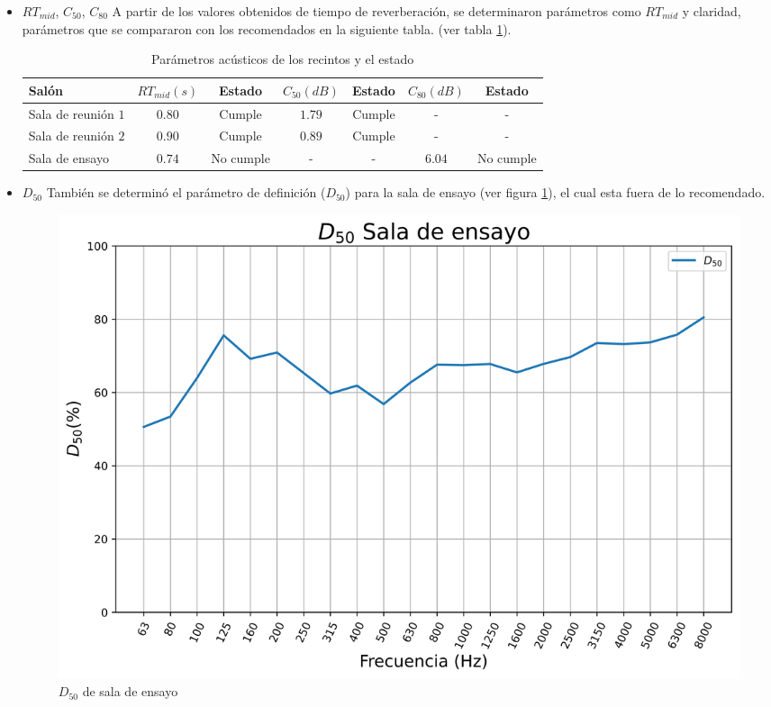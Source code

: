 \begin{itemize}
    \item $RT_{mid}$, $C_{50}$, $C_{80}$
    A partir de los valores obtenidos de tiempo de reverberación, se determinaron parámetros como $RT_{mid}$ y claridad, parámetros que se compararon con los recomendados en la siguiente tabla. (ver tabla \ref{tab: cumplimiento parametros RT}).
    \begin{table}[H]
        \centering
        \begin{tabular}{|l|c|c|c|c|c|c|}
        \hline
          \textbf{Salón}  & $RT_{mid} (s)$ & \textbf{Estado} & $C_{50}(dB)$ & \textbf{Estado} & $C_{80} (dB)$ & \textbf{Estado}\\ \hline
          Sala de reunión $1$   &  $0.80$ & Cumple & $1.79$ & Cumple  & - & - \\ \hline
          Sala de reunión $2$   & $0.90$ & Cumple & $0.89$ & Cumple & - & - \\ \hline
          Sala de ensayo        & $0.74$ & No cumple & - & - & $6.04$ & No cumple \\ \hline
        \end{tabular}
        \caption{Parámetros acústicos de los recintos y el estado}
        \label{tab: cumplimiento parametros RT}
    \end{table}
    \item $D_{50}$ 
    También se determinó el parámetro de definición ($D_{50}$) para la sala de ensayo (ver figura \ref{fig: D50 sala de ensayo}), el cual esta fuera de lo recomendado.
    \begin{figure}[H]
        \centering
        \includegraphics[scale=0.5]{Imagenes/Resultados/D50_ensayo.png}
        \caption{$D_{50}$ de sala de ensayo}
        \label{fig: D50 sala de ensayo}
    \end{figure}
\end{itemize}
